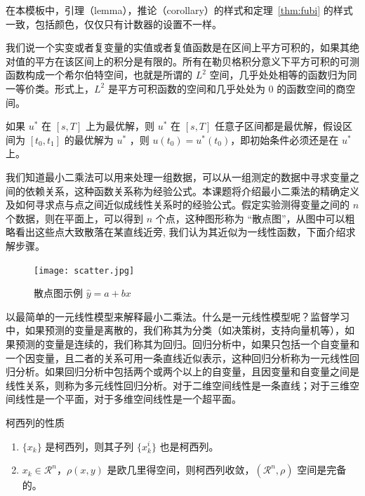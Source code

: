 \documentclass[lang=cn,newtx,10pt,scheme=chinese,pad,twocol]{zznote}
\begin{document}
\begin{note}
	在本模板中，引理（lemma），推论（corollary）的样式和定理~\ref{thm:fubi} 的样式一致，包括颜色，仅仅只有计数器的设置不一样。
\end{note}

我们说一个实变或者复变量的实值或者复值函数是在区间上平方可积的，如果其绝对值的平方在该区间上的积分是有限的。所有在勒贝格积分意义下平方可积的可测函数构成一个希尔伯特空间，也就是所谓的 $L^2$ 空间，几乎处处相等的函数归为同一等价类。形式上，$L^2$ 是平方可积函数的空间和几乎处处为 0 的函数空间的商空间。

\begin{proposition}[最优性原理] \label{pro:max}
	如果 $u^*$ 在 $[s,T]$ 上为最优解，则 $u^*$ 在 $[s, T]$ 任意子区间都是最优解，假设区间为 $[t_0, t_1]$ 的最优解为 $u^*$ ，则 $u(t_0)=u^{*}(t_0)$，即初始条件必须还是在 $u^*$ 上。
\end{proposition}

我们知道最小二乘法可以用来处理一组数据，可以从一组测定的数据中寻求变量之间的依赖关系，这种函数关系称为经验公式。本课题将介绍最小二乘法的精确定义及如何寻求点与点之间近似成线性关系时的经验公式。假定实验测得变量之间的 $n$ 个数据，则在平面上，可以得到 $n$ 个点，这种图形称为 “散点图”，从图中可以粗略看出这些点大致散落在某直线近旁, 我们认为其近似为一线性函数，下面介绍求解步骤。

\begin{figure}[htbp]
	\centering
	\texttt{[image: scatter.jpg]}
	\caption{散点图示例 $\hat{y}=a+bx$ \label{fig:scatter}}
\end{figure}

以最简单的一元线性模型来解释最小二乘法。什么是一元线性模型呢？监督学习中，如果预测的变量是离散的，我们称其为分类（如决策树，支持向量机等），如果预测的变量是连续的，我们称其为回归。回归分析中，如果只包括一个自变量和一个因变量，且二者的关系可用一条直线近似表示，这种回归分析称为一元线性回归分析。如果回归分析中包括两个或两个以上的自变量，且因变量和自变量之间是线性关系，则称为多元线性回归分析。对于二维空间线性是一条直线；对于三维空间线性是一个平面，对于多维空间线性是一个超平面。

\begin{property}\label{property:cauchy}
	柯西列的性质
	\begin{enumerate}
		\item $\{x_k\}$ 是柯西列，则其子列 $\{x_k^i\}$ 也是柯西列。
		\item $x_k\in \mathcal{R}^n$，$\rho(x,y)$ 是欧几里得空间，则柯西列收敛，$(\mathcal{R}^n,\rho)$ 空间是完备的。
	\end{enumerate}
\end{property}
\end{document}
